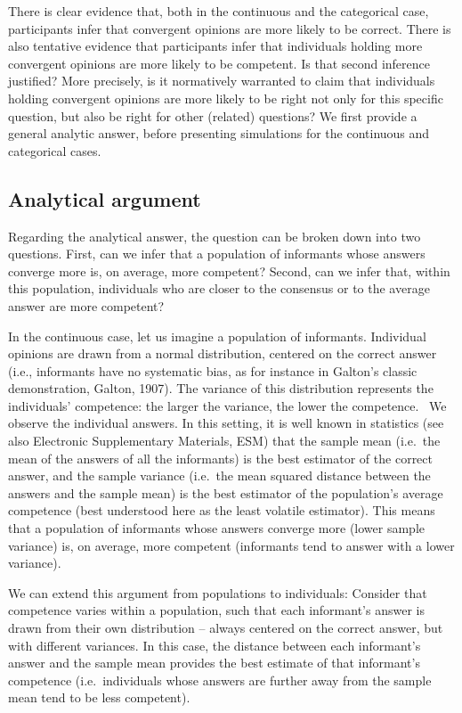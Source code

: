 \documentclass[
  doc,floatsintext]{apa6}
\begin{document}
There is clear evidence that, both in the continuous and the categorical case, participants infer that convergent opinions are more likely to be correct. There is also tentative evidence that participants infer that individuals holding more convergent opinions are more likely to be competent. Is that second inference justified? More precisely, is it normatively warranted to claim that individuals holding convergent opinions are more likely to be right not only for this specific question, but also be right for other (related) questions? We first provide a general analytic answer, before presenting simulations for the continuous and categorical cases.

\subsection{Analytical argument}\label{analytical-argument}

Regarding the analytical answer, the question can be broken down into two questions. First, can we infer that a population of informants whose answers converge more is, on average, more competent? Second, can we infer that, within this population, individuals who are closer to the consensus or to the average answer are more competent?

In the continuous case, let us imagine a population of informants. Individual opinions are drawn from a normal distribution, centered on the correct answer (i.e., informants have no systematic bias, as for instance in Galton's classic demonstration, Galton, 1907). The variance of this distribution represents the individuals' competence: the larger the variance, the lower the competence.~ We observe the individual answers. In this setting, it is well known in statistics (see also Electronic Supplementary Materials, ESM) that the sample mean (i.e.~the mean of the answers of all the informants) is the best estimator of the correct answer, and the sample variance (i.e.~the mean squared distance between the answers and the sample mean) is the best estimator of the population's average competence (best understood here as the least volatile estimator). This means that a population of informants whose answers converge more (lower sample variance) is, on average, more competent (informants tend to answer with a lower variance).

We can extend this argument from populations to individuals: Consider that competence varies within a population, such that each informant's answer is drawn from their own distribution -- always centered on the correct answer, but with different variances. In this case, the distance between each informant's answer and the sample mean provides the best estimate of that informant's competence (i.e.~individuals whose answers are further away from the sample mean tend to be less competent).
\end{document}

